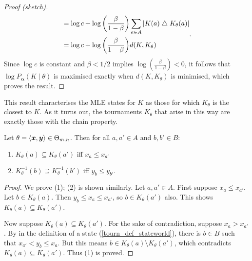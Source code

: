 \begin{proof}[Proof (sketch)]
\[\begin{aligned}
           &=
              \log{c}
              +
              \log{\left(\frac{\beta}{1 - \beta}\right)}
              \sum_{a \in A}{
                  |K(a) \mathrel{\triangle} K_\theta(a)|
              } \\
           &=
              \log{c}
              +
              \log{\left(\frac{\beta}{1 - \beta}\right)}
              d(K, K_\theta)
       \end{aligned}.
    \]
    Since $\log{c}$ is constant and $\beta < 1/2$ implies
    $\log{\left(\frac{\beta}{1 - \beta}\right)} < 0$, it follows that
    $\log{P_{\bm{\alpha}}(K \mid \theta)}$ is maximised exactly when $d(K,
    K_\theta)$ is minimised, which proves the result.
\end{proof}

This result characterises the MLE states for $K$ as those for which $K_\theta$
is the closest to $K$. As it turns out, the tournaments $K_\theta$ that arise
in this way are exactly those with the chain property.

\begin{lemma}
   \label{tourn_result_ktheta_ordering}

   Let $\theta = \langle{\bm{x}, \bm{y}}\rangle \in \Theta_{m,n}$. Then for all
   $a, a' \in A$ and $b, b' \in B$:

   \begin{enumerate}
       \item $K_\theta(a) \subseteq K_\theta(a')$ iff $x_a \le
             x_{a'}$
       \item $K_\theta^{-1}(b) \supseteq K_\theta^{-1}(b')$ iff $y_b
             \le y_{b'}$.
   \end{enumerate}
\end{lemma}

\begin{proof}

    We prove (1); (2) is shown similarly. Let $a, a' \in A$. First suppose $x_a
    \le x_{a'}$. Let $b \in K_\theta(a)$. Then $y_b \le x_a \le x_{a'}$, so $b
    \in K_\theta(a')$ also. This shows $K_\theta(a) \subseteq K_\theta(a')$.

    Now suppose $K_\theta(a) \subseteq K_\theta(a')$. For the sake of
    contradiction, suppose $x_a > x_{a'}$. By 
    in the definition of a state (\cref{tourn_def_stateworld}), there is $b \in B$
    such that $x_{a'} < y_b \le x_{a}$. But this means $b \in K_\theta(a)
    \setminus K_\theta(a')$, which contradicts $K_\theta(a) \subseteq
    K_\theta(a')$. Thus (1) is proved.
\end{proof}

